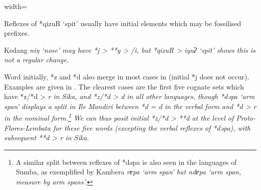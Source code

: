 \begin{table}
\begin{adjustbox}{width=\textwidth}
\begin{threeparttable}
\begin{tablenotes}
			\item[†]	{Reflexes of *qizuR ‘spit’ usually have initial elements which
								may be fossilised prefixes.}
			\item[‡]	{Kedang \it{niŋ} ‘nose’ may have *j > **y > {\0} /i{\gap},
								but *qizuR > \it{iyuʔ} ‘spit’ shows this is not a regular change.}
		\end{tablenotes}
	\end{threeparttable}
\end{adjustbox}
\end{table}

Word initially, *z and *d also merge in most cases in 
(initial *j does not occur).
Examples are given in .
The clearest cases are the first five cognate sets which have
*z/*d > \it{r} in Sika,
and *z/*d > \it{d} in all other languages,
though *dəpa ‘arm span’ displays a split in Ile Mandiri between
*d = \it{d} in the verbal form
and *d > \it{r} in the nominal form.\footnote{
		A similar split between reflexes of *dəpa is also seen in the
		languages of Sumba, as exemplified by Kambera \it{rɐpa} ‘arm span’
		but \it{ndɐpa} ‘arm span,
		measure by arm spans’.}
We can thus posit
initial *z/*d > **d at the level of Proto-Flores-Lembata
for these five words (excepting the verbal reflexes of *dəpa),
with subsequent **d > \it{r} in Sika.

